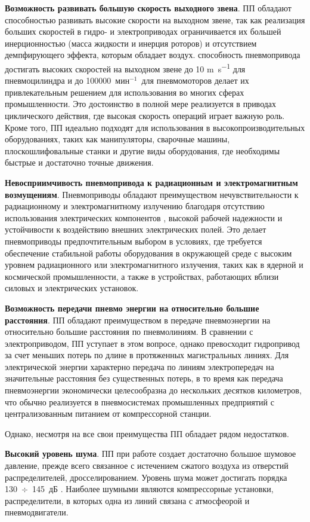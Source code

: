 \textbf{Возможность развивать большую скорость выходного звена}.
ПП обладают способностью развивать высокие скорости на выходном звене,
так как реализация больших скоростей в гидро- и электроприводах ограничивается их
большей инерционностью (масса жидкости и инерция роторов) и отсутствием демпфирующего
эффекта, которым обладает воздух. способность пневмопривода достигать высоких скоростей на выходном
звене до 10 \si{\metre\per\second} для пневмоцилиндра и до \num{100000}~$\text{мин}^{-1}$~для пневмомоторов
делает их привлекательным решением для использования во многих сферах промышленности.
Это достоинство в полной мере
реализуется в приводах циклического действия, где высокая скорость операций
играет важную роль. Кроме того, ПП идеально подходят для использования в
высокопроизводительных оборудованиях, таких как манипуляторы, сварочные машины,
плоскошлифовальные станки и другие виды оборудования, где необходимы быстрые и достаточно точные движения.

\textbf{Невосприимчивость пневмопривода к радиационным и электромагнитным возмущениям}.
Пневмоприводы обладают преимуществом нечувствительности к радиационному и электромагнитному излучению
благодаря отсутствию использования электрических компонентов \cite{kasimov:a, kasimov:b}, высокой
рабочей надежности и устойчивости к
воздействию внешних электрических полей. Это делает пневмоприводы предпочтительным выбором в условиях,
где требуется обеспечение стабильной работы оборудования в окружающей среде с высоким уровнем радиационного или
электромагнитного излучения, таких как в ядерной и космической промышленности, а также в устройствах,
работающих вблизи силовых и электрических установок.

\textbf{Возможность передачи пневмо энергии на относительно большие расстояния}.
ПП обладают преимуществом в передаче пневмоэнергии на относительно большие расстояния по
пневмолиниям. В сравнении с электроприводом,
ПП уступает в этом вопросе, однако превосходит гидропривод за счет меньших
потерь по длине в протяженных магистральных линиях. Для электрической энергии характерно передача по линиям
электропередач на значительные расстояния без существенных потерь, в то время как передача пневмоэнергии
экономически целесообразна до нескольких десятков километров, что
обычно реализуется в пневмосистемах промышленных
предприятий с централизованным питанием от компрессорной станции.


Однако, несмотря на все свои преимущества ПП обладает рядом недостатков.

\textbf{Высокий уровень шума}.
ПП при работе создает достаточно большое шумовое давление, прежде всего связанное с
истечением сжатого воздуха из отверстий распределителей, дросселированием. Уровень шума может
достигать порядка 130~$\div$~145~дБ \cite{pr11092544}. Наиболее шумными являются
компрессорные установки, распределители, в которых одна из линий связана с атмосфеорой и
пневмодвигатели.

